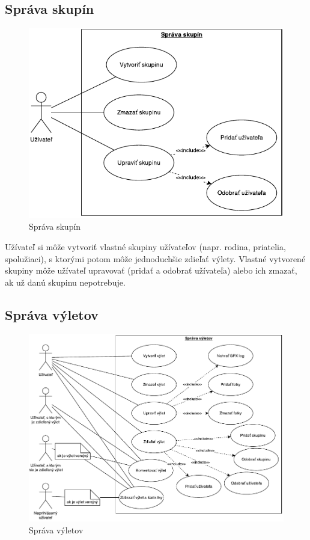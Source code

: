 \documentclass[12pt,a4paper]{scrartcl}
\begin{document}
\subsection{Správa skupín}
\begin{figure}[H]
	\centering
	\includegraphics{use_case/turistika_sprava_skupin.pdf}
	\caption{Správa skupín}
\end{figure}

Užívateľ si môže vytvoriť vlastné skupiny užívateľov (napr. rodina, priatelia, spolužiaci), s ktorými potom môže jednoduchšie zdieľať výlety. Vlastné vytvorené skupiny môže užívateľ upravovať (pridať a odobrať užívateľa) alebo ich zmazať, ak už danú skupinu nepotrebuje.

\subsection{Správa výletov}
\begin{figure}[H]
	\centering
	\includegraphics{use_case/turistika_sprava_vyletov.pdf}
	\caption{Správa výletov}
\end{figure}
\end{document}

